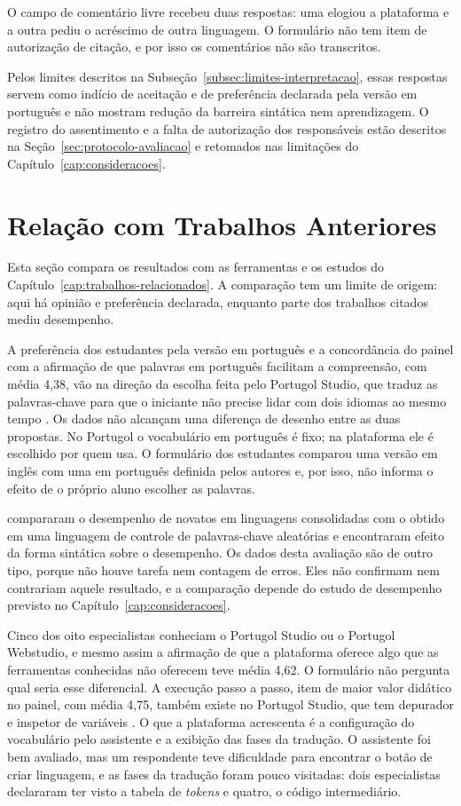 O campo de comentário livre recebeu duas respostas: uma elogiou a plataforma e a outra pediu o acréscimo de outra linguagem. O formulário não tem item de autorização de citação, e por isso os comentários não são transcritos.

Pelos limites descritos na Subseção~\ref{subsec:limites-interpretacao}, essas respostas servem como indício de aceitação e de preferência declarada pela versão em português e não mostram redução da barreira sintática nem aprendizagem. O registro do assentimento e a falta de autorização dos responsáveis estão descritos na Seção~\ref{sec:protocolo-avaliacao} e retomados nas limitações do Capítulo~\ref{cap:consideracoes}.

\section{Relação com Trabalhos Anteriores}
\label{sec:resultado-literatura}

Esta seção compara os resultados com as ferramentas e os estudos do Capítulo~\ref{cap:trabalhos-relacionados}. A comparação tem um limite de origem: aqui há opinião e preferência declarada, enquanto parte dos trabalhos citados mediu desempenho.

A preferência dos estudantes pela versão em português e a concordância do painel com a afirmação de que palavras em português facilitam a compreensão, com média 4,38, vão na direção da escolha feita pelo Portugol Studio, que traduz as palavras-chave para que o iniciante não precise lidar com dois idiomas ao mesmo tempo \cite{univali2026}. Os dados não alcançam uma diferença de desenho entre as duas propostas. No Portugol o vocabulário em português é fixo; na plataforma ele é escolhido por quem usa. O formulário dos estudantes comparou uma versão em inglês com uma em português definida pelos autores e, por isso, não informa o efeito de o próprio aluno escolher as palavras.

 compararam o desempenho de novatos em linguagens consolidadas com o obtido em uma linguagem de controle de palavras-chave aleatórias e encontraram efeito da forma sintática sobre o desempenho. Os dados desta avaliação são de outro tipo, porque não houve tarefa nem contagem de erros. Eles não confirmam nem contrariam aquele resultado, e a comparação depende do estudo de desempenho previsto no Capítulo~\ref{cap:consideracoes}.

Cinco dos oito especialistas conheciam o Portugol Studio ou o Portugol Webstudio, e mesmo assim a afirmação de que a plataforma oferece algo que as ferramentas conhecidas não oferecem teve média 4,62. O formulário não pergunta qual seria esse diferencial. A execução passo a passo, item de maior valor didático no painel, com média 4,75, também existe no Portugol Studio, que tem depurador e inspetor de variáveis \cite{univali2026}. O que a plataforma acrescenta é a configuração do vocabulário pelo assistente e a exibição das fases da tradução. O assistente foi bem avaliado, mas um respondente teve dificuldade para encontrar o botão de criar linguagem, e as fases da tradução foram pouco visitadas: dois especialistas declararam ter visto a tabela de \textit{tokens} e quatro, o código intermediário.

